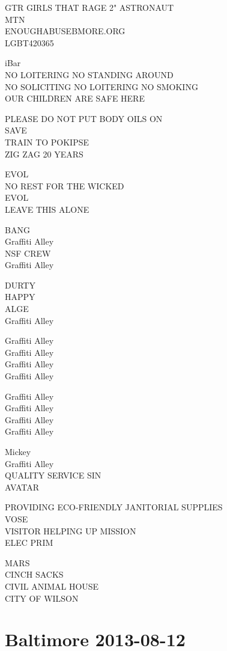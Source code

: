 \documentclass[10pt,letterpaper]{article}
\begin{document}
GTR GIRLS THAT RAGE 2" ASTRONAUT\\
MTN\\
ENOUGHABUSEBMORE.ORG\\
LGBT420365

iBar\\
NO LOITERING NO STANDING AROUND\\
NO SOLICITING NO LOITERING NO SMOKING\\
OUR CHILDREN ARE SAFE HERE

PLEASE DO NOT PUT BODY OILS ON\\
SAVE\\
TRAIN TO POKIPSE\\
ZIG ZAG 20 YEARS

EVOL\\
NO REST FOR THE WICKED\\
EVOL\\
LEAVE THIS ALONE

BANG\\
Graffiti Alley\\
NSF CREW\\
Graffiti Alley

DURTY\\
HAPPY\\
ALGE\\
Graffiti Alley

Graffiti Alley\\
Graffiti Alley\\
Graffiti Alley\\
Graffiti Alley

Graffiti Alley\\
Graffiti Alley\\
Graffiti Alley\\
Graffiti Alley

Mickey\\
Graffiti Alley\\
QUALITY SERVICE SIN\\
AVATAR

PROVIDING ECO{-}FRIENDLY JANITORIAL SUPPLIES\\
VOSE\\
VISITOR HELPING UP MISSION\\
ELEC PRIM

MARS\\
CINCH SACKS\\
CIVIL ANIMAL HOUSE\\
CITY OF WILSON


\section*{Baltimore 2013-08-12}
\end{document}
